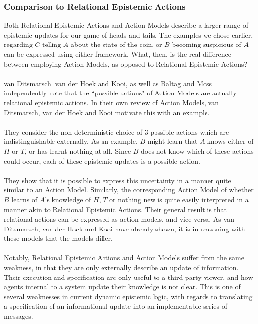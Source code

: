 \documentclass[12pt, a4paper, titlepage]{scrartcl}
\begin{document}
\subsubsection{Comparison to Relational Epistemic Actions} \label{epi_compare}
Both Relational Epistemic Actions and Action Models describe a larger range of
epistemic updates for our game of heads and tails.
The examples we chose earlier, regarding $C$ telling $A$ about the state of the
coin, or $B$ becoming suspicious of $A$ can be expressed using either framework.
What, then, is the real difference between employing Action Models, as opposed
to Relational Epistemic Actions?\\
\\
van Ditsmarsch, van der Hoek and Kooi, as well as Baltag and Moss independently
note that the ``possible actions" of Action Models  are actually relational
epistemic actions.
In their own review of Action Models, van Ditsmarsch, van der Hoek and Kooi
motivate this with an example. \citep{hoek2008dynamic,baltag2005programs}\\
\\
They consider the non-deterministic choice of 3 possible actions which are
indistinguishable externally.
As an example, $B$ might learn that $A$ knows either of $H$ or $T$, or has
learnt nothing at all.
Since $B$ does not know which of these actions could occur, each of these
epistemic updates is a possible action.\\
\\
They show that it is possible to express this uncertainty in a manner quite similar
to an Action Model.
Similarly, the corresponding Action Model of whether $B$ learns of $A$'s
knowledge of $H$, $T$ or nothing new is quite easily interpreted in a manner
akin to Relational Epistemic Actions.
Their general result is that relational actions can be expressed as action
models, and vice versa.
As van Ditsmarsch, van der Hoek and Kooi have already shown, it is in reasoning
with these models that the models differ.\\
\\
Notably, Relational Epistemic Actions and Action Models suffer from the same
weakness, in that they are only externally describe an update of information.
Their execution and specification are only useful to a third-party viewer, and
how agents internal to a system update their knowledge is not clear.
This is one of several weaknesses in current dynamic epistemic logic, with
regards to translating a specification of an informational update into an
implementable series of messages.\\
\end{document}
